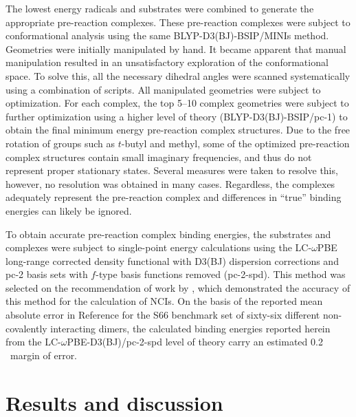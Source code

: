 The lowest energy radicals and substrates were combined to generate the
appropriate pre-reaction complexes. These pre-reaction complexes were subject to
conformational analysis using the same BLYP-D3(BJ)-BSIP/MINIs method. Geometries
were initially manipulated by hand. It became apparent that manual manipulation
resulted in an unsatisfactory exploration of the conformational space. To solve
this, all the necessary dihedral angles were scanned systematically using a
combination of scripts. All manipulated geometries
were subject to optimization. For each complex, the top 5--10 complex geometries
were subject to further optimization using a higher level of theory
(BLYP-D3(BJ)-BSIP/pc-1) to obtain the final minimum energy pre-reaction complex
structures. Due to the free rotation of groups such as $t$-butyl and methyl,
some of the optimized pre-reaction complex structures contain small imaginary
frequencies, and thus do not represent proper stationary states. Several
measures were taken to resolve this, however, no resolution was obtained in many
cases. Regardless, the complexes adequately represent the pre-reaction complex
and differences in ``true'' binding energies can likely be ignored.

To obtain accurate pre-reaction complex binding energies, the substrates and
complexes were subject to single-point energy calculations using the
LC-$\omega$PBE long-range corrected density functional\cite{Vydrov2006,
Vydrov2006a} with D3(BJ) dispersion corrections and pc-2 basis sets with
$f$-type basis functions removed (pc-2-spd).\cite{Johnson2013} This method was
selected on the recommendation of work by \citet{Johnson2013}, which
demonstrated the accuracy of this method for the calculation of NCIs. On the
basis of the reported mean absolute error in Reference  for
the S66 benchmark set of sixty-six different non-covalently interacting
dimers,\cite{Rezac2011} the calculated binding energies reported herein from the
LC-$\omega$PBE-D3(BJ)/pc-2-spd level of theory carry an estimated 0.2 \kcalmol\
margin of error.

\section{Results and discussion}

